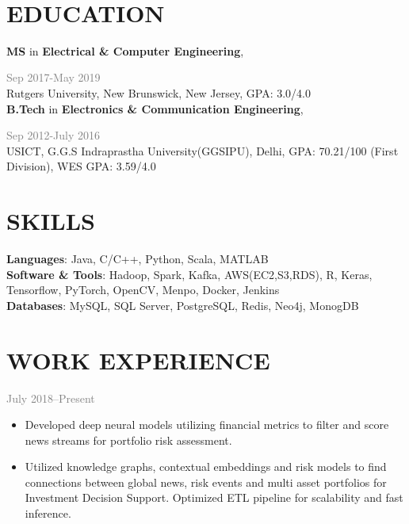 \documentclass[]{mycv} %
\begin{document}
\
\vspace{7pt}
\section{EDUCATION}
\textbf{MS} in \textbf{Electrical \& Computer Engineering}, \hfill{\textcolor{gray}{ Sep 2017-May 2019}\\
Rutgers University, New Brunswick, New Jersey,
GPA: 3.0/4.0 \\
\vspace{1pt}
\textbf{B.Tech} in \textbf{Electronics \& Communication Engineering},
\hfill{\textcolor{gray}{Sep 2012-July 2016}\\
USICT, G.G.S Indraprastha University(GGSIPU), Delhi,
GPA: 70.21/100 (First Division), WES GPA: 3.59/4.0
\section{SKILLS}
 \textbf{Languages}: Java, C/C++, Python, Scala, MATLAB \\
 \textbf{Software \& Tools}: Hadoop, Spark, Kafka, AWS(EC2,S3,RDS), R, Keras, Tensorflow, PyTorch, OpenCV, Menpo, Docker, Jenkins  \\
 \textbf{Databases}: MySQL, SQL Server, PostgreSQL, Redis, Neo4j, MonogDB
 
\section{WORK EXPERIENCE}
{\large\textbf{\color{lightgray}{Data Science Co-op, State Street Corp., NY}}}\hfill{\textcolor{gray}{July 2018--Present}}
\begin{itemize}
	\vspace{-0.5em}
	\setlength\itemsep{-0.2em}
	\item Developed deep neural models utilizing financial metrics to filter and score news streams for portfolio risk assessment.\
	\item  Utilized knowledge graphs, contextual embeddings and risk models to find connections between global news, risk events and multi asset portfolios for Investment Decision Support. Optimized ETL pipeline for scalability and fast inference.
\end{itemize}

}}
\end{document}
